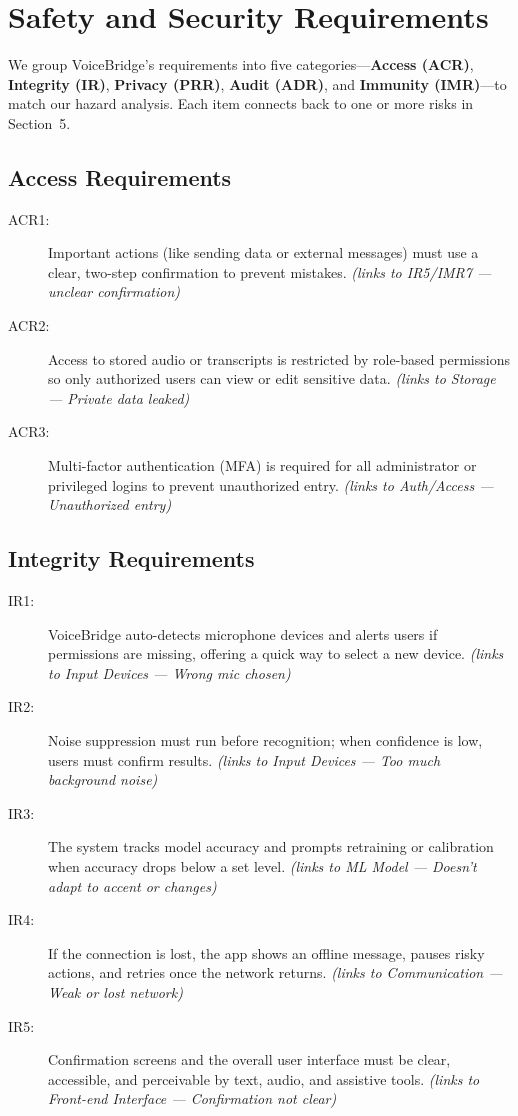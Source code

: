 \documentclass{article}
\begin{document}
\section{Safety and Security Requirements}

We group VoiceBridge’s requirements into five categories—\textbf{Access (ACR)}, \textbf{Integrity (IR)}, \textbf{Privacy (PRR)}, \textbf{Audit (ADR)}, and \textbf{Immunity (IMR)}—to match our hazard analysis. Each item connects back to one or more risks in Section~5.

\subsection{Access Requirements}

\begin{description}
  \item[ACR1:] Important actions (like sending data or external messages) must use a clear, two-step confirmation to prevent mistakes. \emph{(links to IR5/IMR7 — unclear confirmation)}
  \item[ACR2:] Access to stored audio or transcripts is restricted by role-based permissions so only authorized users can view or edit sensitive data. \emph{(links to Storage — Private data leaked)}
  \item[ACR3:] Multi-factor authentication (MFA) is required for all administrator or privileged logins to prevent unauthorized entry. \emph{(links to Auth/Access — Unauthorized entry)}
\end{description}

\subsection{Integrity Requirements}

\begin{description}
  \item[IR1:] VoiceBridge auto-detects microphone devices and alerts users if permissions are missing, offering a quick way to select a new device. \emph{(links to Input Devices — Wrong mic chosen)}
  \item[IR2:] Noise suppression must run before recognition; when confidence is low, users must confirm results. \emph{(links to Input Devices — Too much background noise)}
  \item[IR3:] The system tracks model accuracy and prompts retraining or calibration when accuracy drops below a set level. \emph{(links to ML Model — Doesn’t adapt to accent or changes)}
  \item[IR4:] If the connection is lost, the app shows an offline message, pauses risky actions, and retries once the network returns. \emph{(links to Communication — Weak or lost network)}
  \item[IR5:] Confirmation screens and the overall user interface must be clear, accessible, and perceivable by text, audio, and assistive tools. \emph{(links to Front-end Interface — Confirmation not clear)}
\end{description}
\end{document}
